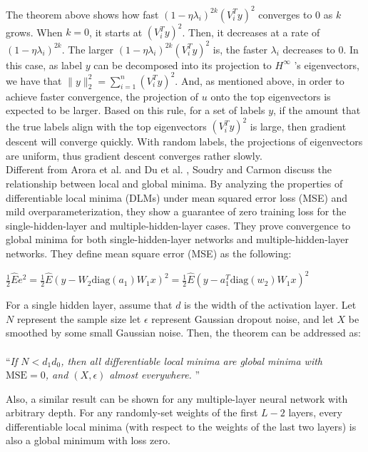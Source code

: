 \documentclass{article}
\begin{document}
The theorem above shows how fast $(1-\eta\lambda_i)^{2k} (V_i^T y)^2$ converges to 0 as $k$ grows. When $k = 0$, it starts at $(V_i^T y)^2$. Then, it decreases at a rate of $(1-\eta\lambda_i)^{2k}$. The larger $(1-\eta\lambda_i)^{2k} (V_i^T y)^2$ is, the faster $\lambda_i$ decreases to 0. In this case, as label $y$ can be decomposed into its projection to $H^{\infty}$ 's eigenvectors, we have that $\|y\|_2^2 = \sum_{i=1}^n{(V_i^T y)^2}$. And, as mentioned above, in order to achieve faster convergence, the projection of $u$ onto the top eigenvectors is expected to be larger. Based on this rule, for a set of labels $y$, if the amount that the true labels align with the top eigenvectors $(V_i^T y)^2$ is large, then gradient descent will converge quickly. With random labels, the projections of eigenvectors are uniform,  thus gradient descent converges rather slowly. \\

\indent Different from Arora et al. \cite{Arora} and Du et al. \cite{SimonDu}, Soudry and Carmon \cite{SoudryCarmon} discuss the relationship between local and global minima. By analyzing the properties of differentiable local minima (DLMs) under mean squared error loss (MSE) and mild overparameterization, they show a guarantee of zero training loss for the single-hidden-layer and multiple-hidden-layer cases. They prove convergence to global minima for both single-hidden-layer networks and multiple-hidden-layer networks. They define mean square error (MSE) as the following:

\begin{center}
    $\frac{1}{2}\hat{E}e^2 = \frac{1}{2}\hat{E}(y-W_2 \text{diag}(a_1)W_1x)^2 = \frac{1}{2}\hat{E}(y-a_1^T \text{diag}(w_2)W_1x)^2$
\end{center}

For a single hidden layer, assume that $d$ is the width of the activation layer. Let $N$ represent the sample size let $\epsilon$ represent Gaussian dropout noise, and let $X$ be smoothed by some small Gaussian noise. Then, the theorem can be addressed as: \\\\
``\textit{If $N< d_1 d_0$, then all differentiable local minima are global minima with $\text{MSE} = 0$, and $(X,\epsilon)$ almost everywhere.} ''

Also, a similar result can be shown for any multiple-layer neural network with arbitrary depth. For any randomly-set weights of the first $L-2$ layers, every differentiable local minima (with respect to the weights of the last two layers) is also a global minimum with loss zero. 
\end{document}

